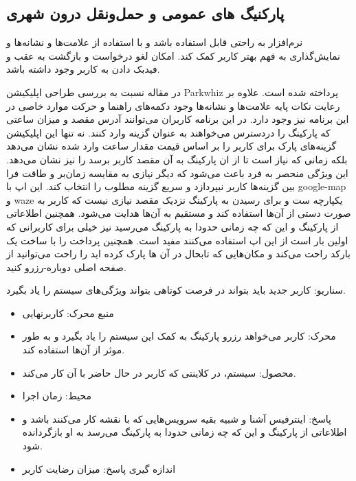 \subsection{پارکنیگ های عمومی و حمل‌و‌نقل درون شهری}
نرم‌افزار به راحتی قابل استفاده باشد و با استفاده از علامت‌ها و نشانه‌ها و نمایش‌گذاری به فهم بهتر کاربر کمک کند. امکان لغو درخواست و بازگشت به عقب و فیدبک دادن به کاربر وجود داشته باشد.

در مقاله \cite{parkwhiz_ux} نسبت به بررسی طراحی اپلیکیشن Parkwhiz پرداخته شده است.
علاوه بر رعایت نکات پایه علامت‌ها و نشانه‌ها وجود دکمه‌های راهنما و حرکت موارد خاصی در این برنامه نیز وجود دارد.
 در این برنامه کاربران می‌توانند آدرس مقصد و میزان ساعتی که پارکینگ را دردسترس می‌خواهند به عنوان گزینه وارد کنند. نه تنها این اپلیکیشن گزینه‌های پارک برای کاربر را بر اساس قیمت‌ مقدار ساعت وارد شده نشان می‌دهد بلکه زمانی که نیاز است تا از ان پارکینگ به آن مقصد کاربر برسد را نیز نشان می‌دهد.
این ویژگی منحصر به فرد باعث می‌شود که دیگر نیازی به مقایسه زمان‌بر و طاقت فرا بین گزینه‌ها کاربر نبپردازد و سریع گزینه مطلوب را انتخاب کند.
این اپ با google-map و waze یکپارچه ست و برای رسیدن به پارکینگ نزدیک مقصد نیازی نیست که کاربر به صورت دستی از آن‌ها استفاده کند و مستقیم به آن‌ها هدایت می‌شود. 
همچنین اطلاعاتی از پارکینگ و این که چه زمانی حدودا به پارکینگ می‌رسید نیز خیلی برای کاربرانی که اولین بار است از این اپ استفاده می‌کنند مفید است.
همچنین پرداخت را با ساخت یک بارکد راحت می‌کند و مکان‌هایی که تابحال در آن ها پارک کرده اید را راحت می‌توانید از صفحه اصلی دوباره-رزرو کنید. 

سناریو: کاربر جدید باید بتواند در فرصت کوتاهی بتواند ویژگی‌های سیستم را یاد بگیرد. 
\begin{itemize}
\item
منبع محرک: کاربرنهایی
\item
محرک: کاربر می‌خواهد رزرو پارکینگ به کمک این سیستم را یاد بگیرد و به طور موثر از آن‌ها استفاده کند. 
\item
محصول: سیستم، در کلاینتی که کاربر در حال حاضر با آن کار می‌کند.
\item
محیط: زمان اجرا
\item
پاسخ: اینترفیس آشنا و شبیه بقیه سرویس‌هایی که با نقشه کار می‌کنند باشد و  اطلاعاتی از پارکینگ و این که چه زمانی حدودا به پارکینگ می‌رسد به او بازگردانده شود.
\item
اندازه گیری پاسخ: میزان رضایت کاربر 
\end{itemize}